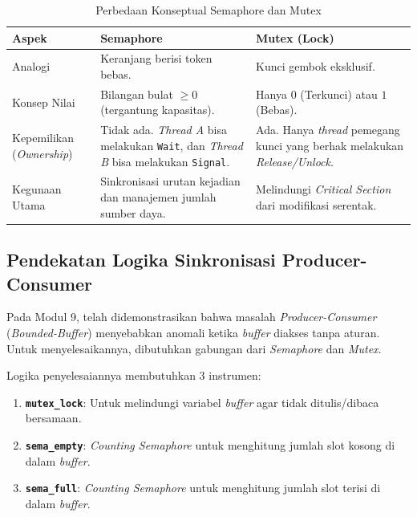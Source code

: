 \begin{table}[h]
	\centering
	\caption{Perbedaan Konseptual Semaphore dan Mutex}
	\begin{tabulary}{\textwidth}{|L|L|L|}
		\hline
		\textbf{Aspek} & \textbf{Semaphore} & \textbf{Mutex (Lock)} \\ \hline
		Analogi & Keranjang berisi token bebas. & Kunci gembok eksklusif. \\ \hline
		Konsep Nilai & Bilangan bulat $\geq 0$ (tergantung kapasitas). & Hanya $0$ (Terkunci) atau $1$ (Bebas). \\ \hline
		Kepemilikan (\textit{Ownership}) & Tidak ada. \textit{Thread A} bisa melakukan \texttt{Wait}, dan \textit{Thread B} bisa melakukan \texttt{Signal}. & Ada. Hanya \textit{thread} pemegang kunci yang berhak melakukan \textit{Release/Unlock}. \\ \hline
		Kegunaan Utama & Sinkronisasi urutan kejadian dan manajemen jumlah sumber daya. & Melindungi \textit{Critical Section} dari modifikasi serentak. \\ \hline
	\end{tabulary}
\end{table}

\subsection{Pendekatan Logika Sinkronisasi Producer-Consumer}

Pada Modul 9, telah didemonstrasikan bahwa masalah \textit{Producer-Consumer} (\textit{Bounded-Buffer}) menyebabkan anomali ketika \textit{buffer} diakses tanpa aturan. Untuk menyelesaikannya, dibutuhkan gabungan dari \textit{Semaphore} dan \textit{Mutex}.

Logika penyelesaiannya membutuhkan 3 instrumen:
\begin{enumerate}
	\item \textbf{\texttt{mutex\_lock}}: Untuk melindungi variabel \textit{buffer} agar tidak ditulis/dibaca bersamaan.
	\item \textbf{\texttt{sema\_empty}}: \textit{Counting Semaphore} untuk menghitung jumlah slot kosong di dalam \textit{buffer}.
	\item \textbf{\texttt{sema\_full}}: \textit{Counting Semaphore} untuk menghitung jumlah slot terisi di dalam \textit{buffer}.
\end{enumerate}

